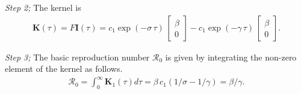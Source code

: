 \documentclass[12pt]{article}
\newcommand{\R}{\ensuremath{\mathcal{R}_0}}
\renewcommand{\vec}[1]{\ensuremath{\mathbf{#1}}} %
\theoremstyle{definition} %
\begin{document}
{\it Step 2;} The kernel is
\begin{align}
\vec K(\tau)= F \vec I(\tau)
= c_1 \exp(-\sigma\,\tau)\,\left[ \begin {array}{c} \beta\\0 \end {array} \right] 
 -c_1 \exp(-\gamma\,\tau)\,\left[ \begin {array}{c} \beta\\0 \end {array} \right].
\end{align}

{\it Step 3;} The basic reproduction number $\R$ is given by integrating the non-zero element of the kernel as follows.
\begin{align}
\R=\int_0^\infty \vec K_1(\tau) d\tau
=\beta\,c_1(1/\sigma-1/\gamma)
=\beta/\gamma.
\end{align}





\end{document}
